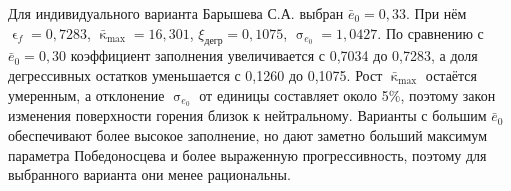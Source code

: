 \documentclass[a4paper,12pt]{article}
\renewcommand{\varepsilon}{\upvarepsilon}
\renewcommand{\sigma}{\upsigma}
\renewcommand{\kappa}{\upkappa}
\newcommand{\heading}[1]{%
          \par\noindent{\centering\fontsize{16pt}{24pt}\selectfont\bfseries #1\par}%
        }
\begin{document}
        \clearpage
        \heading{6. Заключение}
        Для индивидуального варианта Барышева С.А. выбран $\bar e_0=0,33$. При нём $\varepsilon_f=0,7283$, $\bar\kappa_{\max}=16,301$, $\xi_{\mathrm{дегр}}=0,1075$, $\sigma_{e_0}=1,0427$. По сравнению с $\bar e_0=0,30$ коэффициент заполнения увеличивается с 0,7034 до 0,7283, а доля дегрессивных остатков уменьшается с 0,1260 до 0,1075. Рост $\bar\kappa_{\max}$ остаётся умеренным, а отклонение $\sigma_{e_0}$ от единицы составляет около 5\%, поэтому закон изменения поверхности горения близок к нейтральному. Варианты с большим $\bar e_0$ обеспечивают более высокое заполнение, но дают заметно больший максимум параметра Победоносцева и более выраженную прогрессивность, поэтому для выбранного варианта они менее рациональны.

        
\end{document}
